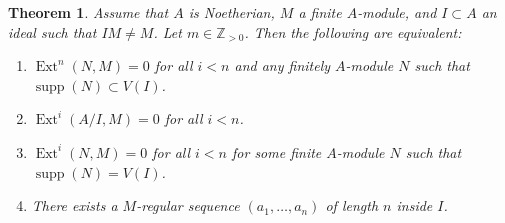\documentclass[leqno, openany]{memoir}
\newtheorem{thm}{Theorem}[section]
\theoremstyle{definition}
\theoremstyle{remark}
\theoremstyle{plain}
\theoremstyle{definition}
\theoremstyle{remark}
\newcommand{\Z}{\mathbb{Z}}
\DeclareMathOperator{\supp}{supp}
\DeclareMathOperator{\Ext}{Ext}
\begin{document}
\begin{thm}
    \label{thm:depth}
    Assume that $A$ is Noetherian, $M$ a finite $A$-module, and $I \subset A$ an ideal such that $IM \neq M$. Let $m \in \Z_{>0}$. Then the following are equivalent:
    \begin{enumerate}
        \item $\Ext^n(N,M) = 0$ for all $i < n$ and any finitely $A$-module $N$ such that $\supp(N) \subset V(I)$.
        \item $\Ext^i(A/I,M) = 0$ for all $i < n$.
        \item $\Ext^i(N,M) = 0$ for all $i < n$ for some finite $A$-module $N$ such that $\supp(N) = V(I)$.
        \item There exists a $M$-regular sequence $(a_1, \ldots, a_n)$ of length $n$ inside $I$.
    \end{enumerate}
\end{thm}
\end{document}
